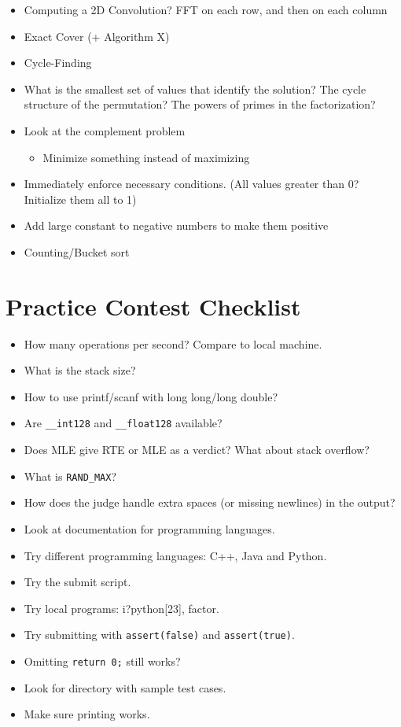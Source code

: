 \documentclass[9pt,a4paper,landscape,oneside]{amsart}
\newenvironment{myitemize}
{\begin{itemize}[leftmargin=.3cm]
	\setlength{\itemsep}{0pt}
	\setlength{\parskip}{0pt}
	\setlength{\parsep}{0pt}     }
{ \end{itemize}                  }
\begin{document}
\begin{multicols*}{3}
\begin{myitemize}
	\item Computing a 2D Convolution? FFT on each row, and then on each column
	\item Exact Cover (+ Algorithm X)
	\item Cycle-Finding
	\item What is the smallest set of values that identify the solution? The cycle structure of the permutation? The powers of primes in the factorization?
	\item Look at the complement problem
		\begin{myitemize}
			\item Minimize something instead of maximizing
		\end{myitemize}
	\item Immediately enforce necessary conditions. (All values greater than 0? Initialize them all to 1)
	\item Add large constant to negative numbers to make them positive
	\item Counting/Bucket sort
\end{myitemize}

\columnbreak
\section*{Practice Contest Checklist}
\begin{myitemize}
	\item How many operations per second? Compare to local machine.
	\item What is the stack size?
	\item How to use printf/scanf with long long/long double?
	\item Are \texttt{\_{}\_{}int128} and \texttt{\_{}\_{}float128} available?
	\item Does MLE give RTE or MLE as a verdict? What about stack overflow?
	\item What is \texttt{RAND\_{}MAX}?
	\item How does the judge handle extra spaces (or missing newlines) in the output?
	\item Look at documentation for programming languages.
	\item Try different programming languages: C++, Java and Python.
	\item Try the submit script.
	\item Try local programs: i?python[23], factor.
	\item Try submitting with \texttt{assert(false)} and \texttt{assert(true)}.
	\item Omitting \texttt{return 0;} still works?
	\item Look for directory with sample test cases.
	\item Make sure printing works.
\end{myitemize}

\label{LastPage}
\end{multicols*}
\end{document}
